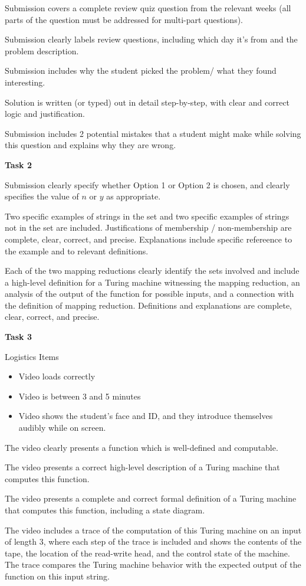 \documentclass[12pt, oneside]{article}
\begin{document}
Submission covers a complete review quiz question from the relevant weeks 
(all parts of the question must be addressed for multi-part questions).

Submission clearly labels review questions, including which day it's from and the problem description.

Submission includes why the student picked the problem/ what they found interesting.

Solution is written (or typed) out in detail step-by-step, with clear and correct logic and justification.

Submission includes 2 potential mistakes that a student might make while solving this question 
and explains why they are wrong.


{\bf Task 2}

Submission clearly specify whether Option 1 or Option 2 is chosen, and clearly specifies the value of $n$ or $y$ as appropriate.

Two specific examples of strings in the set and two specific examples 
of strings not in the set are included. Justifications of membership / non-membership are complete, clear, correct, and precise.
Explanations include specific refereence to the example and to relevant definitions.

Each of the two mapping reductions clearly identify the sets involved and include a high-level definition for
a Turing machine witnessing the mapping reduction, an analysis of the output of the function for possible inputs, and
a connection with the definition of mapping reduction. Definitions and explanations are complete, clear, correct, and precise.	


{\bf Task 3}

Logistics Items
\begin{itemize}
    \item Video loads correctly
    \item Video is between 3 and 5 minutes
    \item Video shows the student's face and ID, and they 
	introduce themselves audibly while on screen.
\end{itemize}

The video clearly presents a function which is well-defined and computable.

The video presents a correct high-level description of a Turing machine that computes this function.

The video presents a complete and correct formal definition of a Turing machine that computes this function,
including a state diagram.

The video includes a trace of the computation of this Turing machine on an input of length $3$, where
each step of the trace is included and shows the contents of the tape, the location of the read-write head, and 
the control state of the machine. The trace compares the Turing machine behavior with the expected output
of the function on this input string.
\end{document}
